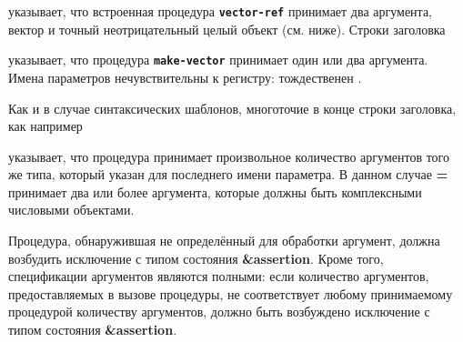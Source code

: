 \noindent{}\unpenalty

указывает, что встроенная процедура {\bfseries\tt vector-ref} принимает два аргумента, вектор
 и точный неотрицательный целый объект  (см. ниже). Строки заголовка

\noindent%
{}
\unpenalty

указывает, что процедура {\bfseries\tt make-vector} принимает один или два
аргумента. Имена параметров нечувствительны к регистру:  тождественен
.

Как и в случае синтаксических шаблонов, многоточие \dotsfoo{} в конце строки заголовка, как например

\noindent{}\unpenalty

указывает, что процедура принимает произвольное количество аргументов того же типа, который
указан для последнего имени параметра. В данном случае {\bfseries\cf =} принимает два или более
аргумента, которые должны быть комплексными числовыми объектами.\vspace{1mm}

\label{typeconventions}
Процедура, обнаружившая не определённый для обработки аргумент, должна возбудить
исключение с типом состояния {\bfseries\cf\&assertion}. Кроме того, спецификации аргументов
являются полными: если количество аргументов, предоставляемых в вызове процедуры, не
соответствует любому принимаемому процедурой количеству аргументов, должно быть возбуждено
исключение с типом состояния {\bfseries\cf\&assertion}.\vspace{1mm}


